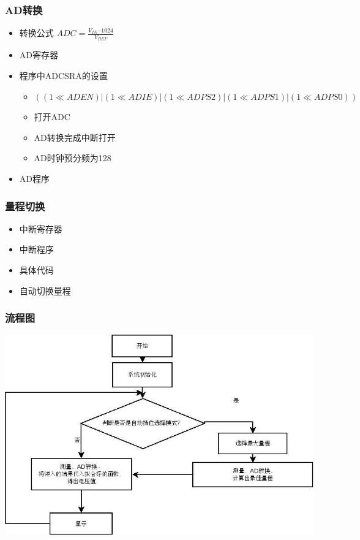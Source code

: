 \documentclass[bigger]{beamer}
\begin{document}
\begin{frame}
\frametitle{AD转换}
\label{sec-3-4}
\begin{itemize}

\item 转换公式 $ADC=\frac{V_{IN}\cdot1024}{V_{REF}}$
\label{sec-3-4-1}%

\item AD寄存器
\label{sec-3-4-2}%

\item 程序中ADCSRA的设置
\label{sec-3-4-3}%
\begin{itemize}
\item $((1 \ll ADEN)|(1 \ll ADIE)|(1 \ll ADPS2)|(1 \ll ADPS1)|(1 \ll ADPS0))$
\item 打开ADC
\item AD转换完成中断打开
\item AD时钟预分频为128
\end{itemize}

\item AD程序
\label{sec-3-4-4}%

\end{itemize} %
\end{frame}
\begin{frame}
\frametitle{量程切换}
\label{sec-3-5}

\begin{itemize}
\item 中断寄存器
\item 中断程序
\item 具体代码
\item 自动切换量程
\end{itemize}
\end{frame}
\begin{frame}
\frametitle{流程图}
\label{sec-3-6}

\includegraphics[width=.9\linewidth]{Diagram1.jpg}
\end{frame}
\end{document}
